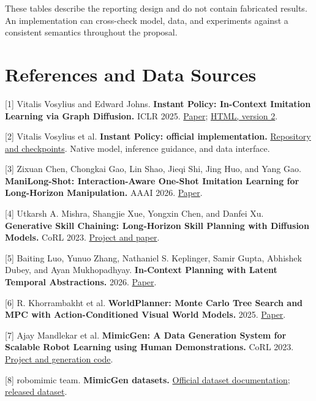 \documentclass[
  10pt,
]{article}
\begin{document}
These tables describe the reporting design and do not contain fabricated results. An implementation can cross-check model, data, and experiments against a consistent semantics throughout the proposal.

\hypertarget{tuxe0i-liux1ec7u-tham-khux1ea3o-vuxe0-nguux1ed3n-dux1eef-liux1ec7u}{%
\section{References and Data Sources}\label{tuxe0i-liux1ec7u-tham-khux1ea3o-vuxe0-nguux1ed3n-dux1eef-liux1ec7u}}

{[}1{]} Vitalis Vosylius and Edward Johns. \textbf{Instant Policy: In-Context Imitation Learning via Graph Diffusion.} ICLR 2025. \href{https://arxiv.org/abs/2411.12633}{Paper}; \href{https://arxiv.org/html/2411.12633v2}{HTML, version 2}.

{[}2{]} Vitalis Vosylius et al. \textbf{Instant Policy: official implementation.} \href{https://github.com/vv19/instant_policy}{Repository and checkpoints}. Native model, inference guidance, and data interface.

{[}3{]} Zixuan Chen, Chongkai Gao, Lin Shao, Jieqi Shi, Jing Huo, and Yang Gao. \textbf{ManiLong-Shot: Interaction-Aware One-Shot Imitation Learning for Long-Horizon Manipulation.} AAAI 2026. \href{https://arxiv.org/abs/2512.16302}{Paper}.

{[}4{]} Utkarsh A. Mishra, Shangjie Xue, Yongxin Chen, and Danfei Xu. \textbf{Generative Skill Chaining: Long-Horizon Skill Planning with Diffusion Models.} CoRL 2023. \href{https://generative-skill-chaining.github.io/}{Project and paper}.

{[}5{]} Baiting Luo, Yunuo Zhang, Nathaniel S. Keplinger, Samir Gupta, Abhishek Dubey, and Ayan Mukhopadhyay. \textbf{In-Context Planning with Latent Temporal Abstractions.} 2026. \href{https://arxiv.org/abs/2602.18694}{Paper}.

{[}6{]} R. Khorrambakht et al. \textbf{WorldPlanner: Monte Carlo Tree Search and MPC with Action-Conditioned Visual World Models.} 2025. \href{https://arxiv.org/abs/2511.03077}{Paper}.

{[}7{]} Ajay Mandlekar et al. \textbf{MimicGen: A Data Generation System for Scalable Robot Learning using Human Demonstrations.} CoRL 2023. \href{https://mimicgen.github.io/}{Project and generation code}.

{[}8{]} robomimic team. \textbf{MimicGen datasets.} \href{https://robomimic.github.io/docs/datasets/mimicgen.html}{Official dataset documentation}; \href{https://huggingface.co/datasets/amandlek/mimicgen_datasets}{released dataset}.
\end{document}
